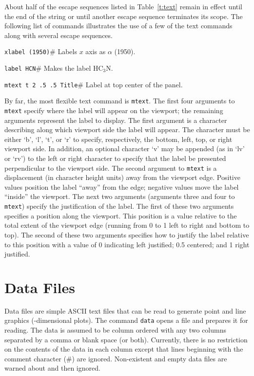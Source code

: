 About half of the escape sequences listed in Table~\ref{t:text} remain in
effect until the end of the string or until another escape sequence
terminates its scope.
The following list of commands illustrates the use of a few of the text
commands along with several escape sequences.
\begin{wiplist}%
  \item {\tt xlabel  (1950)}\hfill\# Labels $x$ axis as $\alpha$ (1950).
\samepage
  \item {\tt label HCN}\hfill\# Makes the label HC${}_3$N.
  \item {\tt mtext t 2 .5 .5 Title}\hfill\# Label at top center of the panel.
\end{wiplist}

By far, the most flexible text command is
{\tt mtext}.%
The first four arguments to {\tt mtext} specify where the label will
appear on the viewport;
the remaining arguments represent the label to display.
The first argument is a character describing along which viewport side
the label will appear.
The character must be either `b', `l', `t', or `r' to specify,
respectively, the bottom, left, top, or right viewport side.
In addition, an optional character `v' may be appended (as in `lv' or
`rv') to the left or right character to specify that the label be
presented perpendicular to the viewport side.
The second argument to {\tt mtext} is a displacement
(in character height units) away from the viewport edge.
Positive values position the label ``away'' from the edge; negative values
move the label ``inside'' the viewport.
The next two arguments (arguments three and four to {\tt mtext})
specify the justification of the label.
The first of these two arguments specifies
a position along the viewport.
This position is a value relative to the total extent of the viewport edge
(\ie running from 0 to 1 left to right and bottom to top).
The second of these two arguments specifies how to justify the
label relative to this position with a value of 0 indicating
left justified; 0.5 centered; and 1 right justified.%

\section{Data Files}

Data files are simple ASCII text files that can be read to generate
point and line graphics (-dimensional plots).
The command 
{\tt data}%
opens a file and prepares it for reading.
The data is assumed to be column ordered
with any two columns separated by a comma or blank space (or both).
Currently, there is no restriction on the
contents of the data in each column except that
lines beginning with
the comment character (\#)
are ignored.
Non-existent and empty data files are warned about and then ignored.


